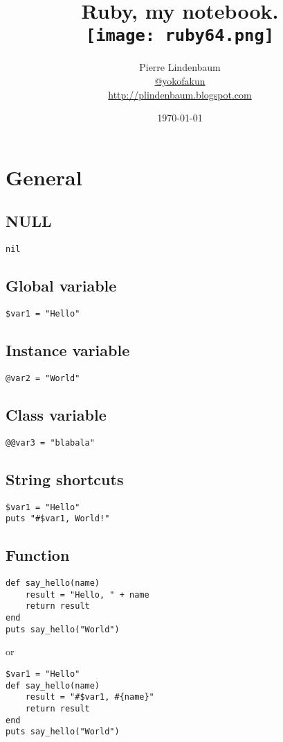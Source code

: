 \documentclass{article}
\date{\today}
\title{Ruby, my notebook.\\\texttt{[image: ruby64.png]}}
\author{Pierre Lindenbaum\\\href{https://twitter.com/yokofakun}{@yokofakun}\\\url{http://plindenbaum.blogspot.com} }
\begin{document}
\maketitle

\tableofcontents

\section{General}
\subsection{NULL}
\begin{lstlisting}
nil
\end{lstlisting}

\subsection{Global variable}
\begin{lstlisting}
$var1 = "Hello"
\end{lstlisting}
\subsection{Instance variable}
\begin{lstlisting}
@var2 = "World"
\end{lstlisting}

\subsection{Class variable}
\begin{lstlisting}
@@var3 = "blabala"
\end{lstlisting}

\subsection{String shortcuts}
\begin{lstlisting}
$var1 = "Hello"
puts "#$var1, World!"
\end{lstlisting}

\subsection{Function}
\begin{lstlisting}
def say_hello(name)
	result = "Hello, " + name
	return result
end
puts say_hello("World")
\end{lstlisting}
or
\begin{lstlisting}
$var1 = "Hello"
def say_hello(name)
	result = "#$var1, #{name}"
	return result
end
puts say_hello("World")
\end{lstlisting}
\end{document}
